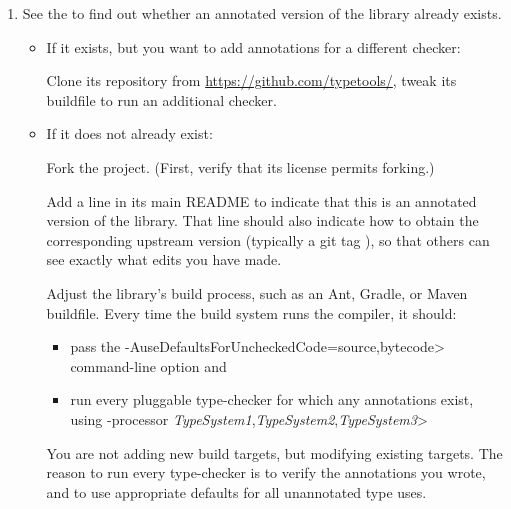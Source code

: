 \begin{enumerate}
\item See the
  to find out whether an annotated version of the library already exists.

  \begin{itemize}
  \item
    If it exists, but you want to add annotations for a different checker:

    Clone its repository from \url{https://github.com/typetools/}, tweak
    its buildfile to run an additional checker.

  \item
    If it does not already exist:

    Fork the project.  (First, verify that its license permits forking.)

    Add a line in its main README to indicate that this is an annotated
    version of the library.  That line should also indicate how to obtain
    the corresponding upstream version (typically a git tag
    ), so that others can see exactly what edits you have
    made.

  Adjust the library's
  build process, such as an Ant, Gradle, or Maven buildfile.
    Every time the build system runs the compiler, it should:
    \begin{itemize}
    \item
      pass the \<-AuseDefaultsForUncheckedCode=source,bytecode>
      command-line option and
    \item
      run every pluggable type-checker for which any
      annotations exist, using \<-processor
      \emph{TypeSystem1},\emph{TypeSystem2},\emph{TypeSystem3}>
    \end{itemize}

  You are not adding new build targets, but modifying existing targets.
  The reason to run every type-checker is to verify
  the annotations you wrote, and to use appropriate defaults for all
  unannotated type uses.
  \end{itemize}


\end{enumerate}
